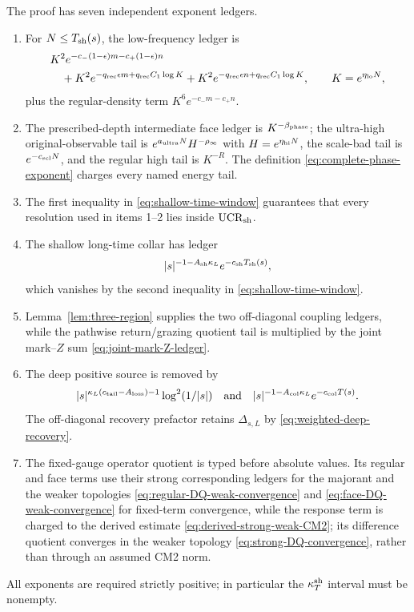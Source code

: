 \documentclass[11pt]{article}
\begin{document}
The proof has seven independent exponent ledgers.
\begin{enumerate}[label=\textup{(A\arabic*)}]
\item For $N\le T_{\rm sh}(s)$, the low-frequency ledger is
\begin{align*}
 &K^2e^{-c_-(1-\epsilon)m-c_+(1-\epsilon)n}\\
 &\quad+K^2e^{-q_{\rm rec}\epsilon m+q_{\rm rec}C_1\log K}
 +K^2e^{-q_{\rm rec}\epsilon n+q_{\rm rec}C_1\log K},
 \qquad K=e^{\eta_{\rm lo}N},
\end{align*}
plus the regular-density term $K^6e^{-c_-m-c_+n}$.
\item The prescribed-depth intermediate face ledger is
$K^{-\beta_{\rm phase}}$; the ultra-high original-observable tail is
$e^{a_{\rm ultra}N}H^{-\rho_\infty}$ with
$H=e^{\eta_{\rm hi}N}$, the scale-bad tail is $e^{-c_{\rm scl}N}$, and the
regular high tail is $K^{-R}$.  The definition
\eqref{eq:complete-phase-exponent} charges every named energy tail.
\item The first inequality in \eqref{eq:shallow-time-window} guarantees
that every resolution used in items 1--2 lies inside
$\mathrm{UCR}_{\rm sh}$.
\item The shallow long-time collar has ledger
\[
 |s|^{-1-A_{\rm sh}\kappa_L}
 e^{-c_{\rm sh}T_{\rm sh}(s)},
\]
which vanishes by the second inequality in
\eqref{eq:shallow-time-window}.
\item Lemma~\ref{lem:three-region} supplies the two off-diagonal coupling
ledgers, while the pathwise return/grazing quotient tail is multiplied by
the joint mark--$Z$ sum \eqref{eq:joint-mark-Z-ledger}.
\item The deep positive source is removed by
\[
 |s|^{\kappa_L(c_{\rm tail}-A_{\rm loss})-1}\log^2(1/|s|)
 \quad\hbox{and}\quad
 |s|^{-1-A_{\rm col}\kappa_L}e^{-c_{\rm col}T(s)}.
\]
The off-diagonal recovery prefactor retains $\Delta_{s,L}$ by
\eqref{eq:weighted-deep-recovery}.
\item The fixed-gauge operator quotient is typed before absolute values.  Its
regular and face terms use their strong corresponding ledgers for the
majorant and the weaker topologies
\eqref{eq:regular-DQ-weak-convergence} and
\eqref{eq:face-DQ-weak-convergence} for fixed-term convergence, while the
response term is charged to the derived estimate
\eqref{eq:derived-strong-weak-CM2}; its difference quotient converges in the
weaker topology \eqref{eq:strong-DQ-convergence}, rather than through an
assumed CM2 norm.
\end{enumerate}
All exponents are required strictly positive; in particular the
$\kappa_T^{\rm sh}$ interval must be nonempty.
\end{document}
